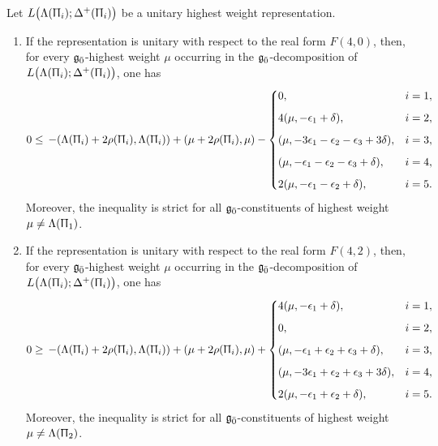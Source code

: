 \begin{proposition}
Let
$
L\bigl(\Lambda(\Uppi_i);\Delta^{+}(\Uppi_i)\bigr)
$
be a unitary highest weight representation.

\begin{enumerate}
 \item[(a)] If the representation is unitary with respect to the real form $F(4,0)$,
then, for every ${\mathfrak{g}_{\bar{0}}}$-highest weight $\mu$ occurring in the ${\mathfrak{g}_{\bar{0}}}$-decomposition of $L\bigl(\Lambda(\Uppi_i);\Delta^{+}(\Uppi_i)\bigr)$, one has
\[
\begin{aligned}
0\leq\,
-(\Lambda(\Uppi_i)+2\rho(\Uppi_i),\Lambda(\Uppi_i))
+(\mu+2\rho(\Uppi_i),\mu)
-
\begin{cases}
0,
& i=1,\\[2mm]
4(\mu,-\epsilon_1+\delta),
& i=2,\\[2mm]
(\mu,-3\epsilon_1-\epsilon_2-\epsilon_3+3\delta),
& i=3,\\[2mm]
(\mu,-\epsilon_1-\epsilon_2-\epsilon_3+\delta),
& i=4,\\[2mm]
2(\mu,-\epsilon_1-\epsilon_2+\delta),
& i=5.
\end{cases}
\end{aligned}
\]
Moreover, the inequality is strict for all ${\mathfrak{g}_{\bar{0}}}$-constituents of highest weight $\mu \neq \Lambda(\Uppi_{1})$.
\item[(b)] If the representation is unitary with respect to the real form $F(4,2)$,
then, for every ${\mathfrak{g}_{\bar{0}}}$-highest weight $\mu$ occurring in the ${\mathfrak{g}_{\bar{0}}}$-decomposition of $L\bigl(\Lambda(\Uppi_i);\Delta^{+}(\Uppi_i)\bigr)$, one has
\[
\begin{aligned}
0\geq\,
-(\Lambda(\Uppi_i)+2\rho(\Uppi_i),\Lambda(\Uppi_i))
+(\mu+2\rho(\Uppi_i),\mu)
+
\begin{cases}
4(\mu,-\epsilon_1+\delta),
& i=1,\\[2mm]
0,
& i=2,\\[2mm]
(\mu,-\epsilon_1+\epsilon_2+\epsilon_3+\delta),
& i=3,\\[2mm]
(\mu,-3\epsilon_1+\epsilon_2+\epsilon_{3}+3\delta),
& i=4,\\[2mm]
2(\mu,-\epsilon_1+\epsilon_2+\delta),
& i=5.
\end{cases}
\end{aligned}
\]
Moreover, the inequality is strict for all ${\mathfrak{g}_{\bar{0}}}$-constituents of highest weight $\mu \neq \Lambda(\Uppi_{2})$.
\end{enumerate}
\end{proposition}




